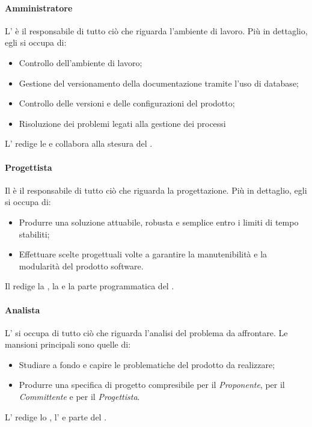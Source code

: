 \paragraph{Amministratore}
L'\textsl{\Amm} è il responsabile di tutto ciò che riguarda l'ambiente di 
lavoro. Più in dettaglio, egli si occupa di:
\begin{itemize}
  \item Controllo dell'ambiente di lavoro;
  \item Gestione del versionamento della documentazione tramite l'uso di 
  database;
  \item Controllo delle versioni e delle configurazioni del prodotto;
  \item Risoluzione dei problemi legati alla gestione dei processi
\end{itemize}
L'\textsl{\Amm} redige le \textsl{\NdP} e collabora alla stesura del 
\textsl{\PdP}.

\paragraph{Progettista}
Il \textsl{\Prog} è il responsabile di tutto ciò che riguarda la progettazione. 
Più in dettaglio, egli si occupa di:
\begin{itemize}
  \item Produrre una soluzione attuabile, robusta e semplice entro i limiti di 
  tempo stabiliti;
  \item Effettuare scelte progettuali volte a garantire la manutenibilità e la 
  modularità del prodotto software.
\end{itemize}
Il \textsl{\Prog} redige la \textsl{\ST}, la \textsl{\DDP} e la parte 
programmatica del \textsl{\PdQ}.

\paragraph{Analista}
L'\textsl{\Ana} si occupa di tutto ciò che riguarda l'analisi del problema da 
affrontare. Le mansioni principali sono quelle di:
\begin{itemize}
  \item Studiare a fondo e capire le problematiche del prodotto da realizzare;
  \item Produrre una specifica di progetto compresibile per il 
  \textsl{Proponente}, per il \textsl{Committente} e per il 
  \textsl{Progettista}.
\end{itemize}
L'\textsl{\Ana} redige lo \textsl{\SdF}, l'\textsl{\AdR} e parte del 
\textsl{\PdQ}.

